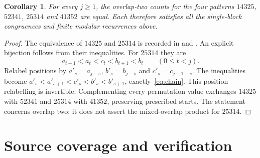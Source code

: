 \documentclass[11pt]{article}
\newtheorem{corollary}[theorem]{Corollary}
\begin{document}
\begin{corollary}\label{cor:equivalent}
For every $j\geq1$, the overlap-two counts for the four patterns
$14325$, $52341$, $25314$ and $41352$ are equal. Each therefore
satisfies all the single-block congruences and finite modular
recurrences above.
\end{corollary}
\begin{proof}
The equivalence of $14325$ and $25314$ is recorded in
\cite[Table~1, p.~11]{BKS23} and \cite[Section~3]{BKS}.
An explicit bijection follows from their inequalities.
For $25314$ they are
\[
 a_{t+1}<a_t<c_t<b_{t+1}<b_t\qquad(0\leq t<j).
\]
Relabel positions by $a'_s=a_{j-s}$, $b'_s=b_{j-s}$ and
$c'_s=c_{j-1-s}$. The inequalities become
$a'_s<a'_{s+1}<c'_s<b'_s<b'_{s+1}$, exactly~\eqref{eq:chain}.
This position relabelling is invertible. Complementing every
permutation value exchanges $14325$ with $52341$ and $25314$ with
$41352$, preserving prescribed starts. The statement concerns
overlap two; it does not assert the mixed-overlap product for $25314$.
\end{proof}

\section{Source coverage and verification}
\end{document}
